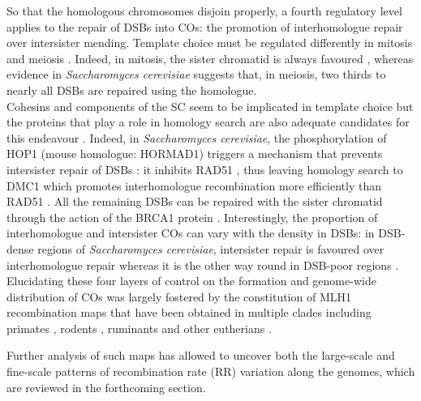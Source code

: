 So that the homologous chromosomes disjoin properly, a fourth regulatory level applies to the repair of DSBs into COs: the promotion of interhomologue repair over intersister mending.
Template choice must be regulated differently in mitosis and meiosis \citep{andersen2010meiotic}.
Indeed, in mitosis, the sister chromatid is always favoured \citep{kadyk1992sister,bzymek2010double}, whereas evidence in \textit{Saccharomyces cerevisiae} suggests that, in meiosis, two thirds \citep{goldfarb2010frequent} to nearly all \citep{pan2011hierarchical} DSBs are repaired using the homologue.\\

Cohesins and components of the SC seem to be implicated in template choice \citep[reviewed in \citealp{pradillo2011template}]{couteau2004component,kim2010sister} but the proteins that play a role in homology search are also adequate candidates for this endeavour \citep[reviewed in][]{youds2011choice}.
Indeed, in \textit{Saccharomyces cerevisiae}, the phosphorylation of HOP1 (mouse homologue: HORMAD1) triggers a mechanism that prevents intersister repair of DSBs \citep{niu2005partner}: it inhibits RAD51 \citep{niu2009regulation}, thus leaving homology search to DMC1 which promotes interhomologue recombination more efficiently than RAD51 \citep{schwacha1997interhomolog}.
All the remaining DSBs can be repaired with the sister chromatid through the action of the BRCA1 protein \citep{adamo2008brc}.
Interestingly, the proportion of interhomologue and intersister COs can vary with the density in DSBs: in DSB-dense regions of \textit{Saccharomyces cerevisiae}, intersister repair is favoured over interhomologue repair whereas it is the other way round in DSB-poor regions \citep{hyppa2010crossover}.\\

Elucidating these four layers of control on the formation and genome-wide distribution of COs was largely fostered by the constitution of MLH1 recombination maps \citep[reviewed in][]{capilla2016mammalian} that have been obtained in multiple clades including primates \citep[e.g.][]{sun2005variation,gruhn2013cytological}, rodents \citep[e.g.][]{froenicke2002male,dumont2011genetic}, ruminants \citep[e.g.][]{vozdova2013comparative,sebestova2016effect} and other eutherians \citep[e.g.][]{borodin2008recombination,segurajoana2013evolution,mary2014meiotic}.

Further analysis of such maps has allowed to uncover both the large-scale and fine-scale patterns of recombination rate (RR) variation along the genomes, which are reviewed in the forthcoming section.





